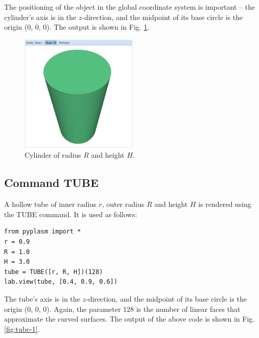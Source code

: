 \documentclass{article}
\begin{document}
The positioning of the object in the global 
coordinate system is important -- the cylinder's axis is in 
the $z$-direction, and the midpoint of its base circle is the 
origin (0, 0, 0). The output is shown in Fig. \ref{fig:cyl-1}.
\newpage

\begin{figure}[!ht]
\begin{center}
\includegraphics[width=0.5\textwidth]{img/cyl-1.png}
\end{center}
\vspace{-2mm}
\caption{Cylinder of radius $R$ and height $H$.}
\label{fig:cyl-1}
\end{figure}

\subsection{Command TUBE}

A hollow tube of inner radius $r$, outer radius $R$ and height
$H$ is rendered using the TUBE command. It is used as follows:
\begin{verbatim}
from pyplasm import *
r = 0.9
R = 1.0
H = 3.0
tube = TUBE([r, R, H])(128)
lab.view(tube, [0.4, 0.9, 0.6])
\end{verbatim}
The tube's axis is in the $z$-direction, and the midpoint of
its base circle is the origin (0, 0, 0). Again, the parameter
128 is the number of linear faces that approximate the 
curved surfaces. The output of the above code is shown in Fig. \ref{fig:tube-1}.

\newpage
\end{document}
